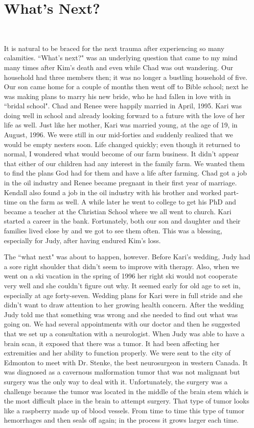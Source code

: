 \documentclass[oneside,12pt]{book}
\begin{document}
\section{What's Next?}
\

It is natural to be braced for the next trauma after experiencing so many calamities. ``What's next?" was an underlying question that came to my mind many times after Kim's death and even while Chad was out wandering. Our household had three members then; it was no longer a bustling household of five. Our son came home for a couple of months then went off to Bible school; next he was making plans to marry his new bride, who he had fallen in love with in ``bridal school". Chad and Renee were happily married in April, 1995. Kari was doing well in school and already looking forward to a future with the love of her life as well. Just like her mother, Kari was married young, at the age of 19, in August, 1996. We were still in our mid-forties and suddenly realized that we would be empty nesters soon. Life changed quickly; even though it returned to normal, I wondered what would become of our farm business. It didn't appear that either of our children had any interest in the family farm. We wanted them to find the plans God had for them and have a life after farming. Chad got a job in the oil industry and Renee became pregnant in their first year of marriage. Kendall also found a job in the oil industry with his brother and worked part-time on the farm as well. A while later he went to college to get his PhD and became a teacher at the Christian School where we all went to church. Kari started a career in the bank. Fortunately, both our son and daughter and their families lived close by and we got to see them often. This was a blessing, especially for Judy, after having endured Kim's loss.

The ``what next" was about to happen, however. Before Kari's wedding, Judy had a sore right shoulder that didn't seem to improve with therapy. Also, when we went on a ski vacation in the spring of 1996 her right ski would not cooperate very well and she couldn't figure out why. It  seemed early for old age to set in, especially at age forty-seven. Wedding plans for Kari were in full stride and she didn't want to draw attention to her growing health concern. After the wedding Judy told me that something was wrong and she needed to find out what was going on. We had several appointments with our doctor and then he suggested that we set up a consultation with a neurologist. When Judy was able to have a brain scan, it exposed that there was a tumor. It had been affecting her extremities and her ability to function properly. We were sent to the city of Edmonton to meet with Dr. Stenke, the best neurosurgeon in western Canada. It was diagnosed as a cavernous malformation tumor that was not malignant but surgery was the only way to deal with it. Unfortunately, the surgery was a challenge because the tumor was located in the middle of the brain stem which is the most difficult place in the brain to attempt surgery. That type of tumor looks like a raspberry made up of blood vessels. From time to time this type of tumor hemorrhages and then seals off again; in the process it grows larger each time.
\end{document}
